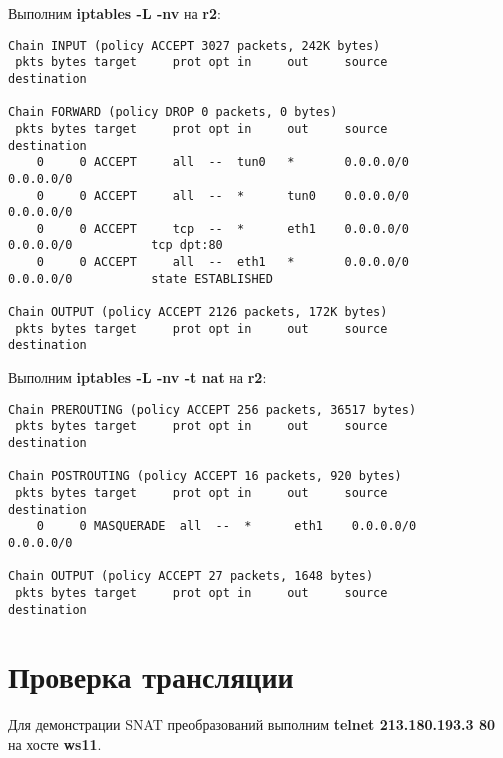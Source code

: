 \documentclass[a4paper,12pt]{article}
\begin{document}
Выполним \textbf{iptables -L -nv} на \textbf{r2}:
\begin{Verbatim}
Chain INPUT (policy ACCEPT 3027 packets, 242K bytes)
 pkts bytes target     prot opt in     out     source               destination         

Chain FORWARD (policy DROP 0 packets, 0 bytes)
 pkts bytes target     prot opt in     out     source               destination         
    0     0 ACCEPT     all  --  tun0   *       0.0.0.0/0            0.0.0.0/0           
    0     0 ACCEPT     all  --  *      tun0    0.0.0.0/0            0.0.0.0/0           
    0     0 ACCEPT     tcp  --  *      eth1    0.0.0.0/0            0.0.0.0/0           tcp dpt:80 
    0     0 ACCEPT     all  --  eth1   *       0.0.0.0/0            0.0.0.0/0           state ESTABLISHED 

Chain OUTPUT (policy ACCEPT 2126 packets, 172K bytes)
 pkts bytes target     prot opt in     out     source               destination     
\end{Verbatim}

Выполним \textbf{iptables -L -nv -t nat} на \textbf{r2}:
\begin{Verbatim}
Chain PREROUTING (policy ACCEPT 256 packets, 36517 bytes)
 pkts bytes target     prot opt in     out     source               destination         

Chain POSTROUTING (policy ACCEPT 16 packets, 920 bytes)
 pkts bytes target     prot opt in     out     source               destination         
    0     0 MASQUERADE  all  --  *      eth1    0.0.0.0/0            0.0.0.0/0           

Chain OUTPUT (policy ACCEPT 27 packets, 1648 bytes)
 pkts bytes target     prot opt in     out     source               destination 
\end{Verbatim}

\section{Проверка трансляции}

Для демонстрации SNAT преобразований выполним \textbf{telnet 213.180.193.3 80} на хосте \textbf{ws11}.
\end{document}
